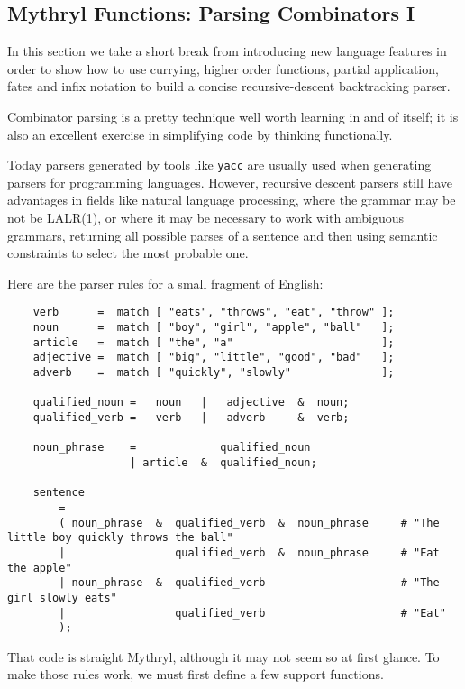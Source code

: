 \subsection{Mythryl Functions:  Parsing Combinators I}
\label{section:tut:fullmonte:parsing-combinators-i}

In this section we take a short break from introducing new 
language features in order to show how to use currying, higher 
order functions, partial application, fates and infix 
notation to build  a concise recursive-descent backtracking parser. 

Combinator parsing is a pretty technique well worth learning 
in and of itself;  it is also an excellent exercise in simplifying 
code by thinking functionally.

Today parsers generated by tools like {\tt yacc} 
are usually used when generating parsers for programming 
languages.  However, recursive descent parsers still have 
advantages in fields like natural language processing, where 
the grammar may be not be LALR(1), or where it may be 
necessary to work with ambiguous grammars, returning all 
possible parses of a sentence and then using semantic 
constraints to select the most probable one.

Here are the parser rules for a small fragment of English:

\begin{verbatim}
    verb      =  match [ "eats", "throws", "eat", "throw" ];
    noun      =  match [ "boy", "girl", "apple", "ball"   ];
    article   =  match [ "the", "a"                       ];
    adjective =  match [ "big", "little", "good", "bad"   ];
    adverb    =  match [ "quickly", "slowly"              ];

    qualified_noun =   noun   |   adjective  &  noun;
    qualified_verb =   verb   |   adverb     &  verb;

    noun_phrase    =             qualified_noun
                   | article  &  qualified_noun;

    sentence
        =
        ( noun_phrase  &  qualified_verb  &  noun_phrase     # "The little boy quickly throws the ball"
        |                 qualified_verb  &  noun_phrase     # "Eat the apple"
        | noun_phrase  &  qualified_verb                     # "The girl slowly eats"
        |                 qualified_verb                     # "Eat"
        );
\end{verbatim}

That code is straight Mythryl, although it may not seem so 
at first glance.  To make those rules work, we must first 
define a few support functions.

